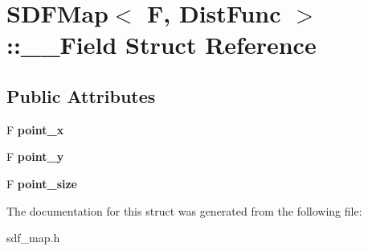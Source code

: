 \hypertarget{structSDFMap_1_1____Field}{}\section{S\+D\+F\+Map$<$ F, Dist\+Func $>$\+:\+:\+\_\+\+\_\+\+Field Struct Reference}
\label{structSDFMap_1_1____Field}
\subsection*{Public Attributes}
\begin{DoxyCompactItemize}
\item 
\hypertarget{structSDFMap_1_1____Field_ac02e8617717ed78646397a88b08e4647}{}F {\bfseries point\+\_\+x}\label{structSDFMap_1_1____Field_ac02e8617717ed78646397a88b08e4647}

\item 
\hypertarget{structSDFMap_1_1____Field_ab85d878b7248ff8edaff6f191b7c1bee}{}F {\bfseries point\+\_\+y}\label{structSDFMap_1_1____Field_ab85d878b7248ff8edaff6f191b7c1bee}

\item 
\hypertarget{structSDFMap_1_1____Field_a21abc289bf632863ee719e4e5912ccca}{}F {\bfseries point\+\_\+size}\label{structSDFMap_1_1____Field_a21abc289bf632863ee719e4e5912ccca}

\end{DoxyCompactItemize}


The documentation for this struct was generated from the following file\+:\begin{DoxyCompactItemize}
\item 
sdf\+\_\+map.\+h\end{DoxyCompactItemize}
